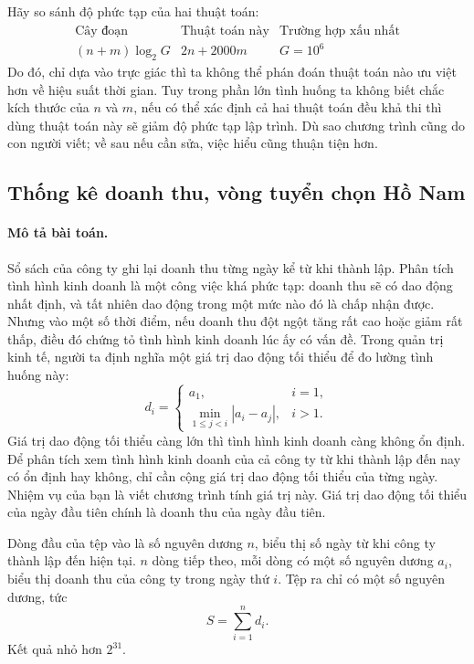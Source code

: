 \documentclass[11pt]{article}
\begin{document}
Hãy so sánh độ phức tạp của hai thuật toán:
\[
\begin{array}{c|c|c}
  \text{Cây đoạn} & \text{Thuật toán này} & \text{Trường hợp xấu nhất}\\
  \hline
  (n+m)\log_2 G & 2n+2000m & G=10^6
\end{array}
\]
Do đó, chỉ dựa vào trực giác thì ta không thể phán đoán thuật toán nào ưu việt
hơn về hiệu suất thời gian. Tuy trong phần lớn tình huống ta không biết chắc
kích thước của \(n\) và \(m\), nếu có thể xác định cả hai thuật toán đều khả
thi thì dùng thuật toán này sẽ giảm độ phức tạp lập trình. Dù sao chương trình
cũng do con người viết; về sau nếu cần sửa, việc hiểu cũng thuận tiện hơn.

\subsection{Thống kê doanh thu, vòng tuyển chọn Hồ Nam}

\paragraph{Mô tả bài toán.}
Sổ sách của công ty ghi lại doanh thu từng ngày kể từ khi thành lập. Phân tích
tình hình kinh doanh là một công việc khá phức tạp: doanh thu sẽ có dao động
nhất định, và tất nhiên dao động trong một mức nào đó là chấp nhận được. Nhưng
vào một số thời điểm, nếu doanh thu đột ngột tăng rất cao hoặc giảm rất thấp,
điều đó chứng tỏ tình hình kinh doanh lúc ấy có vấn đề. Trong quản trị kinh
tế, người ta định nghĩa một giá trị dao động tối thiểu để đo lường tình huống
này:
\[
  d_i =
  \begin{cases}
    a_1, & i=1,\\
    \min\limits_{1\le j<i} |a_i-a_j|, & i>1.
  \end{cases}
\]
Giá trị dao động tối thiểu càng lớn thì tình hình kinh doanh càng không ổn
định. Để phân tích xem tình hình kinh doanh của cả công ty từ khi thành lập
đến nay có ổn định hay không, chỉ cần cộng giá trị dao động tối thiểu của từng
ngày. Nhiệm vụ của bạn là viết chương trình tính giá trị này. Giá trị dao động
tối thiểu của ngày đầu tiên chính là doanh thu của ngày đầu tiên.

Dòng đầu của tệp vào là số nguyên dương \(n\), biểu thị số ngày từ khi công ty
thành lập đến hiện tại. \(n\) dòng tiếp theo, mỗi dòng có một số nguyên dương
\(a_i\), biểu thị doanh thu của công ty trong ngày thứ \(i\). Tệp ra chỉ có
một số nguyên dương, tức
\[
  S=\sum_{i=1}^{n} d_i.
\]
Kết quả nhỏ hơn \(2^{31}\).
\end{document}
